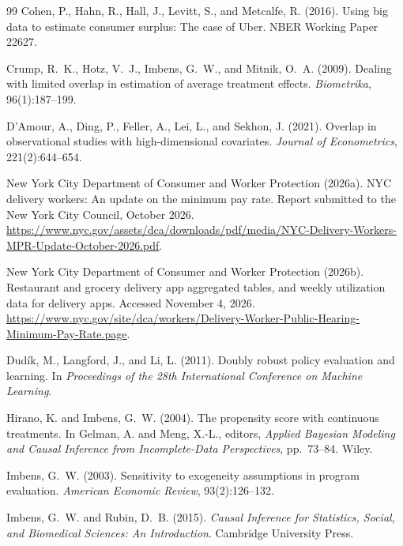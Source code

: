\documentclass[11pt]{article}
\theoremstyle{remark}
\begin{document}
\begin{thebibliography}{99}
Cohen, P., Hahn, R., Hall, J., Levitt, S., and Metcalfe, R. (2016).
Using big data to estimate consumer surplus: The case of Uber.
NBER Working Paper 22627.

Crump, R.~K., Hotz, V.~J., Imbens, G.~W., and Mitnik, O.~A. (2009).
Dealing with limited overlap in estimation of average treatment effects.
\emph{Biometrika}, 96(1):187--199.

D'Amour, A., Ding, P., Feller, A., Lei, L., and Sekhon, J. (2021).
Overlap in observational studies with high-dimensional covariates.
\emph{Journal of Econometrics}, 221(2):644--654.

New York City Department of Consumer and Worker Protection (2026a).
NYC delivery workers: An update on the minimum pay rate. Report submitted to the New York City Council, October 2026.
\url{https://www.nyc.gov/assets/dca/downloads/pdf/media/NYC-Delivery-Workers-MPR-Update-October-2026.pdf}.

New York City Department of Consumer and Worker Protection (2026b).
Restaurant and grocery delivery app aggregated tables, and weekly utilization data for delivery apps. Accessed November 4, 2026.
\url{https://www.nyc.gov/site/dca/workers/Delivery-Worker-Public-Hearing-Minimum-Pay-Rate.page}.

Dud\'ik, M., Langford, J., and Li, L. (2011).
Doubly robust policy evaluation and learning.
In \emph{Proceedings of the 28th International Conference on Machine Learning}.

Hirano, K. and Imbens, G.~W. (2004).
The propensity score with continuous treatments.
In Gelman, A. and Meng, X.-L., editors, \emph{Applied Bayesian Modeling and Causal Inference from Incomplete-Data Perspectives}, pp.~73--84. Wiley.

Imbens, G.~W. (2003).
Sensitivity to exogeneity assumptions in program evaluation.
\emph{American Economic Review}, 93(2):126--132.

Imbens, G.~W. and Rubin, D.~B. (2015).
\emph{Causal Inference for Statistics, Social, and Biomedical Sciences: An Introduction}.
Cambridge University Press.


\end{thebibliography}
\end{document}
